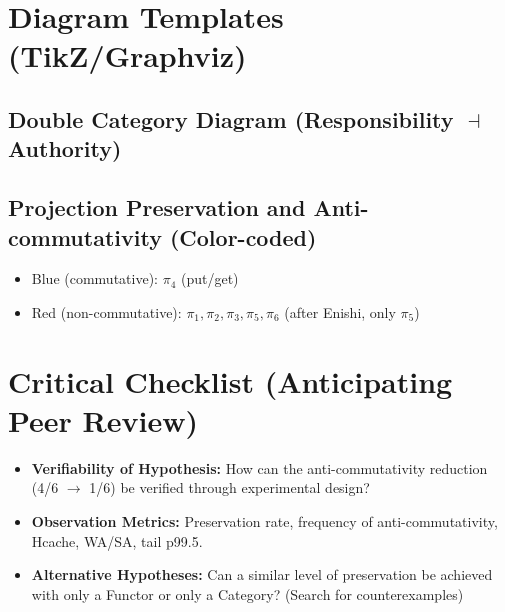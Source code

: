 \documentclass[10pt]{article}
\begin{document}
\appendix
\section{Diagram Templates (TikZ/Graphviz)}

\subsection{Double Category Diagram (Responsibility $\dashv$ Authority)}


\subsection{Projection Preservation and Anti-commutativity (Color-coded)}
\begin{itemize}
    \item Blue (commutative): $\pi_4$ (put/get)
    \item Red (non-commutative): $\pi_1,\pi_2,\pi_3,\pi_5,\pi_6$ (after Enishi, only $\pi_5$)
\end{itemize}

\section{Critical Checklist (Anticipating Peer Review)}
\begin{itemize}
    \item \textbf{Verifiability of Hypothesis:} How can the anti-commutativity reduction (4/6 $\to$ 1/6) be verified through experimental design?
    \item \textbf{Observation Metrics:} Preservation rate, frequency of anti-commutativity, Hcache, WA/SA, tail p99.5.
    \item \textbf{Alternative Hypotheses:} Can a similar level of preservation be achieved with only a Functor or only a Category? (Search for counterexamples)
\end{itemize}
\end{document}
